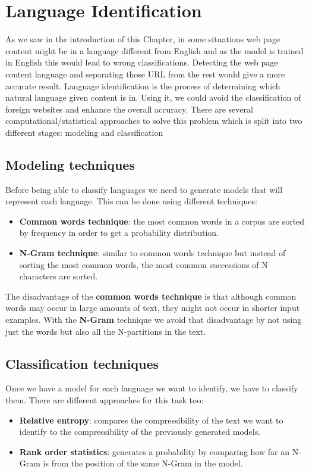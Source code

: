 

\section{Language Identification}
As we saw in the introduction of this Chapter, in some situations web page content might be in a language different from English and as the model is trained in English this would lead to wrong 
classifications. Detecting the web page content language and separating those URL from the rest would give a more accurate result.
Language identification is the process of determining which natural language given content is in. Using it, we could avoid the classification of foreign websites and enhance the overall accuracy.
There are several computational/statistical approaches to solve this problem which is split into two different stages: modeling and classification

\subsection{Modeling techniques}
Before being able to classify languages we need to generate models that will represent each language. This can be done using different techniques:
\begin{itemize}
  \item {\bf Common words technique}: the most common words in a corpus are sorted by frequency in order to get a probability distribution.
  \item {\bf N-Gram technique}: similar to common words technique but instead of sorting the most common words, the most common successions of N characters are sorted.
\end{itemize}  
The disadvantage of the {\bf common words technique} is that although common words may occur in large amounts of text, they might not occur in shorter input examples. With the {\bf N-Gram} technique 
we avoid that disadvantage by not using just the words but also all the N-partitions in the text.


\subsection{Classification techniques}
Once we have a model for each language we want to identify, we have to classify them. There are different approaches for this task too:
\begin{itemize}
  \item {\bf Relative entropy}: compares the compressibility of the text we want to identify to the compressibility of the previously generated models.
  \item {\bf Rank order statistics}: generates a probability by comparing how far an N-Gram is from the position of the same N-Gram in the model.
\end{itemize}
